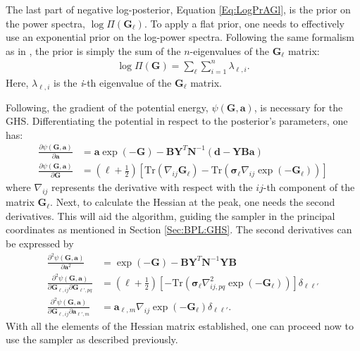 \qquad The last part of negative log-posterior, Equation \eqref{Eq:LogPrAGl}, is the prior on the power spectra, $\log\Pi(\bm{G}_{\ell})$. To apply a flat prior, one needs to effectively use an exponential prior on the log-power spectra. Following the same formalism as in \cite{Taylor2008,SreeThesis}, the prior is simply the sum of the $n$-eigenvalues of the $\mathbf{G}_{\ell}$ matrix:
\begin{align}
\label{Eq:LogPiorGl}
\log\Pi(\mathbf{G}) = \sum_{\ell}\sum_{i=1}^n\lambda_{\ell,i}.
\end{align}
Here, $\lambda_{{\ell},i}$ is the \textit{i}-th eigenvalue of the $\mathbf{G}_{\ell}$ matrix.

\qquad Following, the gradient of the potential energy, $\psi(\mathbf{G},\mathbf{a})$, is necessary for the GHS. Differentiating the potential in respect to the posterior's parameters, one has:
\begin{align}
    \frac{\partial\psi(\mathbf{G},\mathbf{a})}{\partial\mathbf{a}} & = \mathbf{a}\exp(-\mathbf{G}) - \mathbf{B}\mathbf{Y}^T\mathbf{N}^{-1}(\mathbf{d}-\mathbf{Y}\mathbf{B}\mathbf{a}) \\
    \frac{\partial\psi(\mathbf{G},\mathbf{a})}{\partial\mathbf{G}} & = \left( {\ell}+\frac{1}{2}\right)\left[\mathrm{Tr}(\nabla_{ij}\mathbf{G}_{\ell}) -\mathrm{Tr}(\boldsymbol{\sigma}_{\ell}\nabla_{ij}\exp(-\mathbf{G}_{\ell})) \right]
\end{align}
where $\nabla_{ij}$ represents the derivative with respect with the $ij$-th component of the matrix $\mathbf{G}_{\ell}$. Next, to calculate the Hessian at the peak, one needs the second derivatives. This will aid the algorithm, guiding the sampler in the principal coordinates as mentioned in Section \ref{Sec:BPL:GHS}. The second derivatives can be expressed by
\begin{align}
    \frac{\partial^2\psi(\mathbf{G},\mathbf{a})}{\partial\mathbf{a}^2} & = \exp(-\mathbf{G}) - \mathbf{B}\mathbf{Y}^T\mathbf{N}^{-1}\mathbf{Y}\mathbf{B} \label{Eq:BPL:HessianAlms} \\
    \frac{\partial^2\psi(\mathbf{G},\mathbf{a})}{\partial\mathbf{G}_{\ell,ij}\partial\mathbf{G}_{\ell',pq}} & = \left( {\ell}+\frac{1}{2}\right)\left[-\mathrm{Tr}(\boldsymbol{\sigma}_{\ell}\nabla^2_{ij,pq} \exp(-\mathbf{G}_{\ell})) \right]\delta_{\ell\ell'} \\
    \frac{\partial^2\psi(\mathbf{G},\mathbf{a})}{\partial\mathbf{G}_{\ell,ij}\partial\mathbf{a}_{\ell',m}} & = \mathbf{a}_{\ell,m}\nabla_{ij}\exp(-\mathbf{G}_{\ell})\delta_{\ell\ell'}.\label{Eq:BPL:HessianOffDiag}
\end{align}
With all the elements of the Hessian matrix established, one can proceed now to use the sampler as described previously. 

